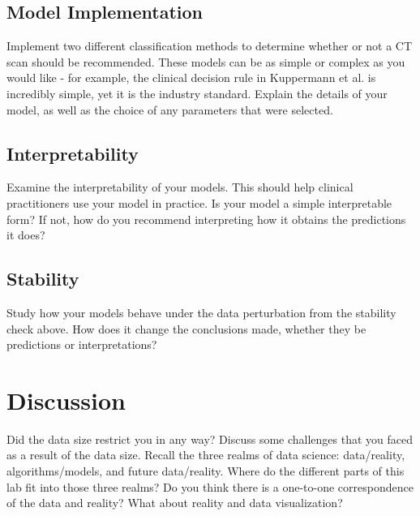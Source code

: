 \documentclass[10pt,letterpaper]{article}
\begin{document}
\subsection*{Model Implementation}

Implement two different classification methods to determine whether or not a CT scan should be recommended. These models can be as simple or complex as you would like - for example, the clinical decision rule in Kuppermann et al. is incredibly simple, yet it is the industry standard. Explain the details of your model, as well as the choice of any parameters that were selected.

\subsection*{Interpretability}

Examine the interpretability of your models. This should help clinical practitioners use your model in practice. Is your model a simple interpretable form? If not, how do you recommend interpreting how it obtains the predictions it does?

\subsection*{Stability}

Study how your models behave under the data perturbation from the stability check above. How does it change the conclusions made, whether they be predictions or interpretations?

\section*{Discussion}

Did the data size restrict you in any way? Discuss some challenges that you faced as a result of the data size. Recall the three realms of data science: data/reality, algorithms/models, and future data/reality. Where do the different parts of this lab fit into those three realms? Do you think there is a one-to-one correspondence of the data and reality? What about reality and data visualization?
\end{document}
